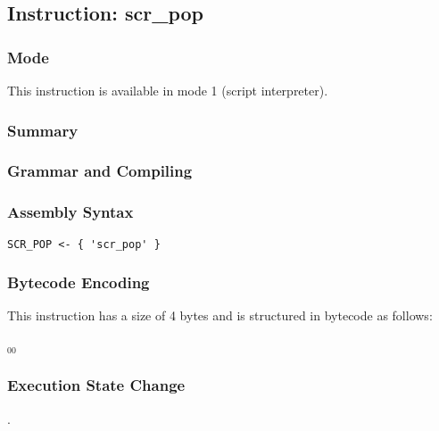 \subsection{Instruction: scr\_pop}

\subsubsection{Mode}
This instruction is available in mode 1 (script interpreter).
\subsubsection{Summary}


\subsubsection{Grammar and Compiling}


\subsubsection{Assembly Syntax}

\begin{myquote}
\begin{verbatim}
SCR_POP <- { 'scr_pop' }
\end{verbatim}
\end{myquote}

\subsubsection{Bytecode Encoding}

This instruction has a size of 4 bytes and is structured in bytecode as follows:

$_{00}$\ 


\subsubsection{Execution State Change}

.


